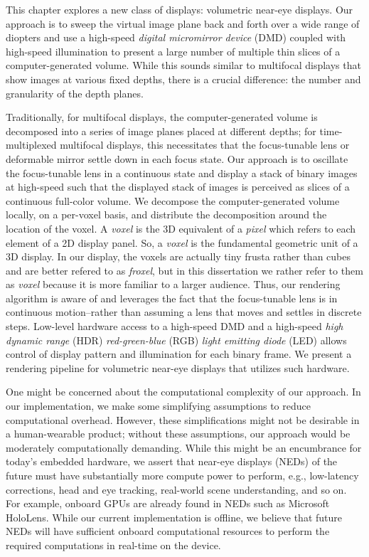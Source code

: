 This chapter explores a new class of displays: volumetric near-eye displays. Our approach is to sweep the virtual image plane back and forth over a wide range of diopters and use a high-speed \emph{digital micromirror device} (DMD) coupled with high-speed illumination to present a large number of multiple thin slices of a computer-generated volume. While this sounds similar to multifocal displays that show images at various fixed depths, there is a crucial difference: the number and granularity of the depth planes.

Traditionally, for multifocal displays, the computer-generated volume is decomposed into a series of image planes placed at different depths; for time-multiplexed multifocal displays, this necessitates that the focus-tunable lens or deformable mirror settle down in each focus state. Our approach is to oscillate the focus-tunable lens in a continuous state and display a stack of binary images at high-speed such that the displayed stack of images is perceived as slices of a continuous full-color volume. We decompose the computer-generated volume locally, on a per-voxel basis, and distribute the decomposition around the location of the voxel. A \emph{voxel} is the 3D equivalent of a \emph{pixel} which refers to each element of a 2D display panel. So, a \emph{voxel} is the fundamental geometric unit of a 3D display. In our display, the voxels are actually tiny frusta rather than cubes and are better refered to as \emph{froxel}, but in this dissertation we rather refer to them as \emph{voxel} because it is more familiar to a larger audience. Thus, our rendering algorithm is aware of and leverages the fact that the focus-tunable lens is in continuous motion--rather than assuming a lens that moves and settles in discrete steps. Low-level hardware access to a high-speed DMD and a high-speed \emph{high dynamic range} (HDR) \emph{red-green-blue} (RGB) \emph{light emitting diode} (LED) allows control of display pattern and illumination for each binary frame. We present a rendering pipeline for volumetric near-eye displays that utilizes such hardware.

One might be concerned about the computational complexity of our approach. In our implementation, we make some simplifying assumptions to reduce computational overhead. However, these simplifications might not be desirable in a human-wearable product; without these assumptions, our approach would be moderately computationally demanding. While this might be an encumbrance for today's embedded hardware, we assert that near-eye displays (NEDs) of the future must have substantially more compute power to perform, e.g., low-latency corrections, head and eye tracking, real-world scene understanding, and so on. For example, onboard GPUs are already found in NEDs such as Microsoft HoloLens. While our current implementation is offline, we believe that future NEDs will have sufficient onboard computational resources to perform the required computations in real-time on the device.  
% 
% 
% 

